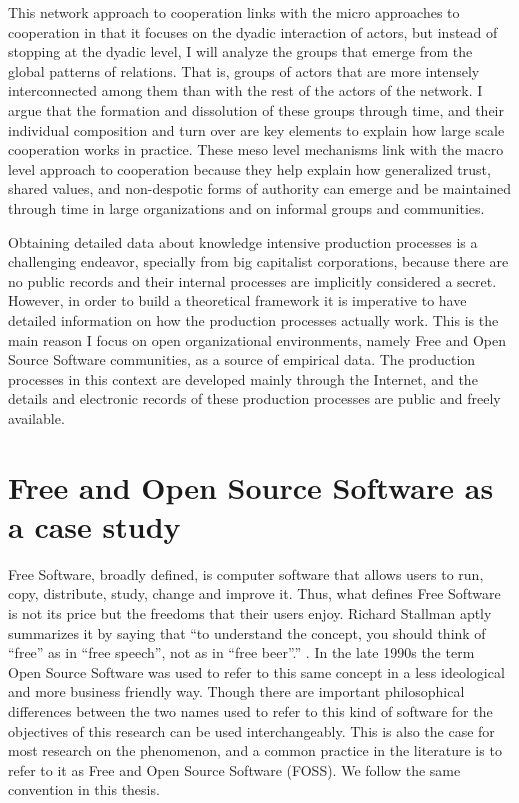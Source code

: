 This network approach to cooperation links with the micro approaches to cooperation in that it focuses on the dyadic interaction of actors, but instead of stopping at the dyadic level, I will analyze the groups that emerge from the global patterns of relations. That is, groups of actors that are more intensely interconnected among them than with the rest of the actors of the network. I argue that the formation and dissolution of these groups through time, and their individual composition and turn over are key elements to explain how large scale cooperation works in practice. These meso level mechanisms link with the macro level approach to cooperation because they help explain how generalized trust, shared values, and non-despotic forms of authority can emerge and be maintained through time in large organizations and on informal groups and communities.

Obtaining detailed data about knowledge intensive production processes is a challenging endeavor, specially from big capitalist corporations, because there are no public records and their internal processes are implicitly considered a secret. However, in order to build a theoretical framework it is imperative to have detailed information on how the production processes actually work. This is the main reason I focus on open organizational environments, namely Free and Open Source Software communities, as a source of empirical data. The production processes in this context are developed mainly through the Internet, and the details and electronic records of these production processes are public and freely available.

\section{Free and Open Source Software as a case study}

Free Software, broadly defined, is computer software that allows users to run, copy, distribute, study, change and improve it. Thus, what defines Free Software is not its price but the freedoms that their users enjoy. Richard Stallman aptly summarizes it by saying that ``to understand the concept, you should think of ``free'' as in ``free speech'', not as in ``free beer''.'' \citep[3]{stallman:2002}. In the late 1990s the term Open Source Software was used to refer to this same concept in a less ideological and more business friendly way. Though there are important philosophical differences between the two names used to refer to this kind of software \citep[75]{stallman:2002b} for the objectives of this research can be used interchangeably. This is also the case for most research on the phenomenon, and a common practice in the literature is to refer to it as Free and Open Source Software (FOSS). We follow the same convention in this thesis.

